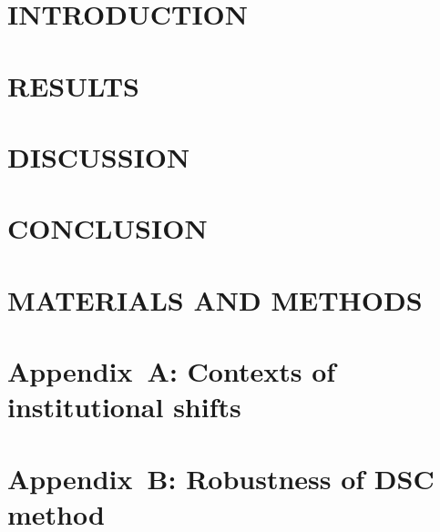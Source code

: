 \documentclass{../nsr}
\begin{document}
\maketitle

\section{INTRODUCTION}\label{sec:introduction}


\section{RESULTS}\label{sec:results}



\section{DISCUSSION}\label{sec:discussion}


\section{CONCLUSION}\label{sec:conclusion}


\section{MATERIALS AND METHODS}\label{sec:methods}



\appendix
\label{appendix}
\renewcommand{\figurename}{Supplementary Figure}
\renewcommand{\appendixname}{Appendix~\Alph{section}}
\setcounter{section}{0}

\section{Appendix~A: Contexts of institutional shifts}\label{secS1}
\renewcommand{\thefigure}{A\arabic{figure}}
\renewcommand{\thetable}{A\arabic{table}}
\setcounter{figure}{0}
\setcounter{table}{0}


\section{Appendix~B: Robustness of DSC method}\label{secS2}
\renewcommand{\thefigure}{B\arabic{figure}}
\renewcommand{\thetable}{B\arabic{table}}
\setcounter{figure}{0}
\setcounter{table}{0}

\end{document}
